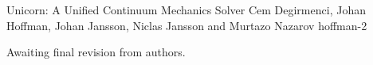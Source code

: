              {Unicorn: A Unified Continuum Mechanics Solver}
              {Cem Degirmenci, Johan Hoffman, Johan Jansson, Niclas Jansson and Murtazo Nazarov}
              {hoffman-2}

Awaiting final revision from authors.

